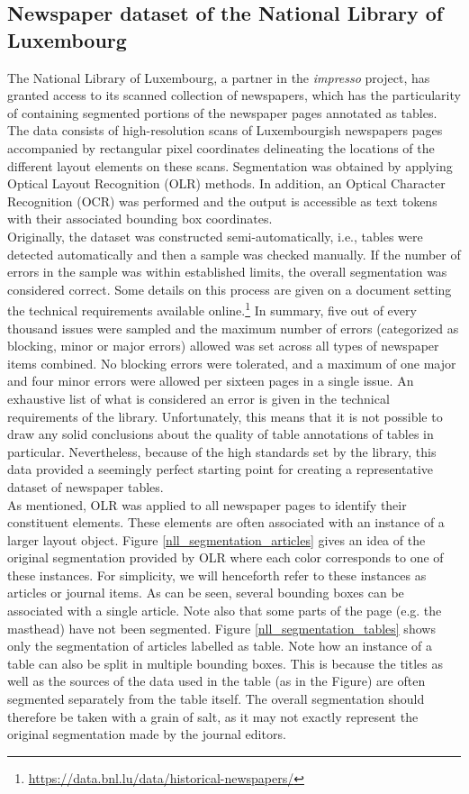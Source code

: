 \subsection{Newspaper dataset of the National Library of Luxembourg}
The National Library of Luxembourg, a partner in the \textit{impresso} project, has granted access to its scanned collection of newspapers, which has the particularity of containing segmented portions of the newspaper pages annotated as tables. The data consists of high-resolution scans of Luxembourgish newspapers pages accompanied by rectangular pixel coordinates delineating the locations of the different layout elements on these scans. Segmentation was obtained by applying Optical Layout Recognition (OLR) methods. In addition, an Optical Character Recognition (OCR) was performed and the output is accessible as text tokens with their associated bounding box coordinates. \\
Originally, the dataset was constructed semi-automatically, i.e., tables were detected automatically and then a sample was checked manually. If the number of errors in the sample was within established limits, the overall segmentation was considered correct. Some details on this process are given on a document setting the technical requirements available online.\footnote{\url{https://data.bnl.lu/data/historical-newspapers/}} In summary, five out of every thousand issues were sampled and the maximum number of errors (categorized as blocking, minor or major errors) allowed was set across all types of newspaper items combined. No blocking errors were tolerated, and a maximum of one major and four minor errors were allowed per sixteen pages in a single issue. An exhaustive list of what is considered an error is given in the technical requirements of the library. Unfortunately, this means that it is not possible to draw any solid conclusions about the quality of table annotations of tables in particular. Nevertheless, because of the high standards set by the library, this data provided a seemingly perfect starting point for creating a representative dataset of newspaper tables.\\
As mentioned, OLR was applied to all newspaper pages to identify their constituent elements. These elements are often associated with an instance of a larger layout object. Figure \ref{nll_segmentation_articles} gives an idea of the original segmentation provided by OLR where each color corresponds to one of these instances. For simplicity, we will henceforth refer to these instances as articles or journal items. As can be seen, several bounding boxes can be associated with a single article. Note also that some parts of the page (e.g. the masthead) have not been segmented. Figure \ref{nll_segmentation_tables} shows only the segmentation of articles labelled as table. Note how an instance of a table can also be split in multiple bounding boxes. This is because the titles as well as the sources of the data used in the table (as in the Figure) are often segmented separately from the table itself. The overall segmentation should therefore be taken with a grain of salt, as it may not exactly represent the original segmentation made by the journal editors.

